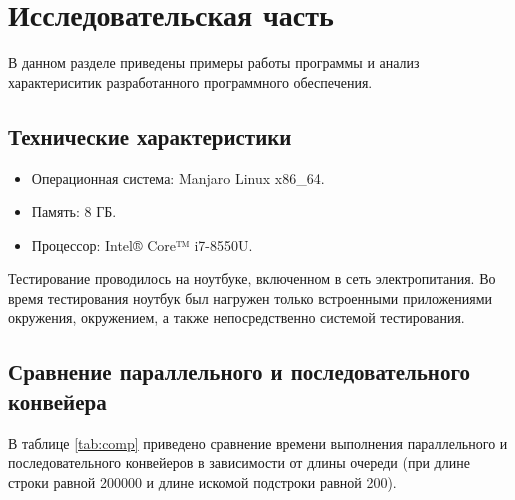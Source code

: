 \chapter{Исследовательская часть}

В данном разделе приведены примеры работы программы и анализ характериситик разработанного программного обеспечения.

\section{Технические характеристики}

\begin{itemize}
	\item Операционная система: Manjaro \cite{manjaro} Linux \cite{linux} x86\_64.
	\item Память: 8 ГБ.
	\item Процессор: Intel® Core™ i7-8550U\cite{intel}.
\end{itemize}

Тестирование проводилось на ноутбуке, включенном в сеть электропитания. Во время тестирования ноутбук был нагружен только встроенными приложениями окружения, окружением, а также непосредственно системой тестирования.

\section{Сравнение параллельного и последовательного конвейера}

В таблице \ref{tab:comp} приведено сравнение времени выполнения параллельного и последовательного конвейеров в зависимости от длины очереди (при длине строки равной 200000 и длине искомой подстроки равной 200).

\clearpage

